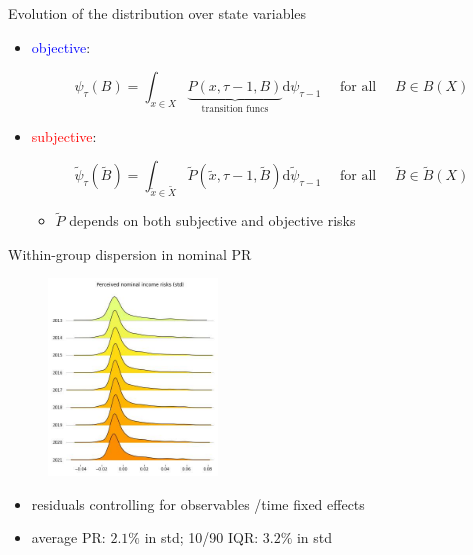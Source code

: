\documentclass{beamer}
\begin{document}
\begin{frame}{Evolution of the distribution over state variables}
	\begin{itemize}
		\item \textcolor{blue}{objective}: 
		
		\begin{equation*}
			\label{Eq:DistDynObj}
			\psi_{\tau}(B)=\int_{x \in X} \underbrace{P(x, \tau-1, B)}_{\text{transition funcs}}  \mathrm{d}\psi_{\tau-1} \quad \text { for all } \quad B\in B(X)
		\end{equation*}
		
		
		\item \textcolor{red}{subjective}: 
		
		\begin{equation*}
			\label{Eq:DistDynSub}
			\tilde \psi_{\tau}(\tilde B)=\int_{\tilde x \in \tilde X} \tilde P(\tilde x, \tau-1, \tilde B) \mathrm{d} \tilde \psi_{\tau-1} \quad \text { for all } \quad \tilde B \in \tilde B(X)
		\end{equation*}
		\begin{itemize}
			\item $\tilde P$ depends on both subjective and objective risks 
		\end{itemize}
	\end{itemize}
\end{frame}


\begin{frame}{Within-group dispersion in nominal PR}
	\label{appendix:incstd}
	\begin{figure}
		\centering
		\includegraphics[width=0.4\textwidth]{figures/joy_incstd.jpg}
	\end{figure}
	\begin{itemize}
		\item  residuals controlling for observables /time fixed effects
		\item average PR:  $2.1\%$ in std; 10/90 IQR: $3.2\%$ in std \quad \hyperlink{rincstd_hist}{}    
	\end{itemize}
\end{frame}
\end{document}
